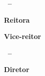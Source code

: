 
{
\ABNTEXchapterfont\setlength{\parindent}{0cm}
\textsf{\textbf{\UnB\ -- \unb} }

{\scriptsize \textsf{\textbf{Reitora}}} \\ %
\textsc{\reitor}

{\scriptsize \textsf{\textbf{Vice-reitor}}}\\
\textsc{\vicereitor}


\vspace{0.8cm}

\textsf{\textbf{\CPAI\ -- \cpai}}

{\scriptsize \textsf{\textbf{Diretor}}}\\
\textsc{\diretorcpai}

%
%


}
